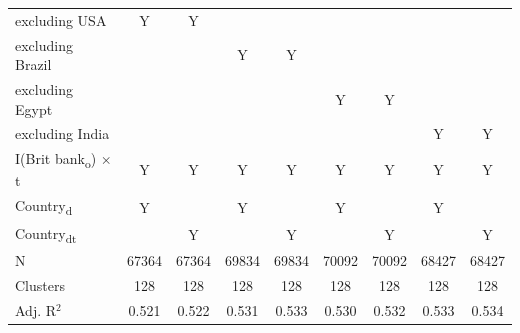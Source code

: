 {\begin{tabular}{l*{8}{c}}
excluding USA&           Y   &           Y   &               &               &               &               &               &               \\
excluding Brazil&               &               &           Y   &           Y   &               &               &               &               \\
excluding Egypt&               &               &               &               &           Y   &           Y   &               &               \\
excluding India&               &               &               &               &               &               &           Y   &           Y   \\
I(Brit bank\textsubscript{o}) $\times$ t&           Y   &           Y   &           Y   &           Y   &           Y   &           Y   &           Y   &           Y   \\
Country\textsubscript{d}&           Y   &               &           Y   &               &           Y   &               &           Y   &               \\
Country\textsubscript{dt}&               &           Y   &               &           Y   &               &           Y   &               &           Y   \\
\midrule
N           &       67364   &       67364   &       69834   &       69834   &       70092   &       70092   &       68427   &       68427   \\
Clusters    &         128   &         128   &         128   &         128   &         128   &         128   &         128   &         128   \\
Adj. R{$^2$}&       0.521   &       0.522   &       0.531   &       0.533   &       0.530   &       0.532   &       0.533   &       0.534   \\
\bottomrule
\end{tabular}
}
